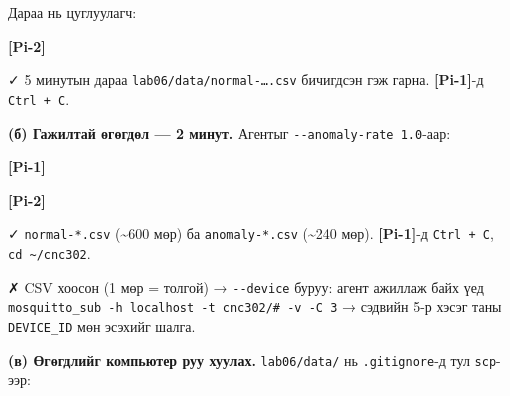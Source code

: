 Дараа нь цуглуулагч:

\textbf{{[}Pi-2{]}}

\begin{Shaded}
\begin{Highlighting}[]
 
\end{Highlighting}
\end{Shaded}

✓ 5 минутын дараа \texttt{lab06/\allowbreak{}data/\allowbreak{}normal-\ldots{}.\allowbreak{}csv} бичигдсэн гэж гарна. \textbf{{[}Pi-1{]}}-д \texttt{Ctrl\ +\ C}.

\textbf{(б) Гажилтай өгөгдөл --- 2 минут.} Агентыг \texttt{-\/\allowbreak{}-anomaly-rate\ 1.\allowbreak{}0}-аар:

\textbf{{[}Pi-1{]}}

\begin{Shaded}
\begin{Highlighting}[]
 \StringTok{\textquotesingle{}\textquotesingle{}}
\end{Highlighting}
\end{Shaded}

\textbf{{[}Pi-2{]}}

\begin{Shaded}
\begin{Highlighting}[]
 
\end{Highlighting}
\end{Shaded}

✓ \texttt{normal-*.csv} (\textasciitilde600 мөр) ба \texttt{anomaly-*.csv} (\textasciitilde240 мөр). \textbf{{[}Pi-1{]}}-д \texttt{Ctrl\ +\ C}, \texttt{cd\ \textasciitilde{}/cnc302}.

✗ CSV хоосон (1 мөр = толгой) → \texttt{-\/-device} буруу: агент ажиллаж байх үед \texttt{mosquitto\_sub\ -h\ localhost\ -t\ \textquotesingle{}cnc302/\#\textquotesingle{}\ -v\ -C\ 3} → сэдвийн 5-р хэсэг таны \texttt{DEVICE\_ID} мөн эсэхийг шалга.

\textbf{(в) Өгөгдлийг компьютер руу хуулах.} \texttt{lab06/data/} нь \texttt{.gitignore}-д тул \texttt{scp}-ээр:

